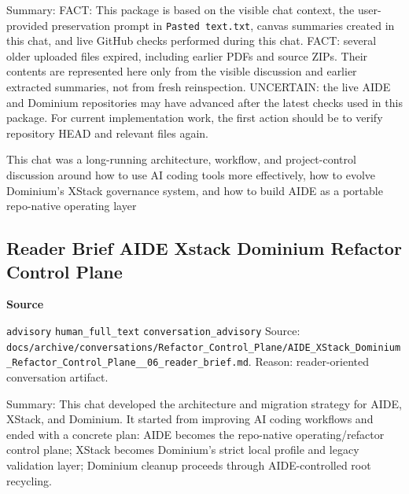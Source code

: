 \documentclass[9pt,a4paper,openany]{book}
\newcommand{\vonecallout}[3]{\par\medskip\noindent\begingroup\setlength{\fboxsep}{7pt}\colorbox{DomCalloutBg}{\parbox{0.94\linewidth}{\textbf{\textcolor{#1}{#2}}\par #3}}\endgroup\par\medskip}
\begin{document}
Summary: FACT: This package is based on the visible chat context, the user-\allowbreak{}provided preservation prompt in \texttt{Pasted text.\allowbreak{}txt}, canvas summaries created in this chat, and live GitHub checks performed during this chat.\allowbreak{} FACT: several older uploaded files expired, including earlier PDFs and source ZIPs.\allowbreak{} Their contents are represented here only from the visible discussion and earlier extracted summaries, not from fresh reinspection.\allowbreak{} UNCERTAIN: the live AIDE and Dominium repositories may have advanced after the latest checks used in this package.\allowbreak{} For current implementation work, the first action should be to verify repository HEAD and relevant files again.\allowbreak{}


This chat was a long-\allowbreak{}running architecture, workflow, and project-\allowbreak{}control discussion around how to use AI coding tools more effectively, how to evolve Dominium's XStack governance system, and how to build AIDE as a portable repo-\allowbreak{}native operating layer



\subsection{Reader Brief AIDE Xstack Dominium Refactor Control Plane}

\vonecallout{DomSlate}{Source}{\texttt{advisory} \texttt{human\_\allowbreak{}full\_\allowbreak{}text} \texttt{conversation\_\allowbreak{}advisory} Source: \texttt{docs/\allowbreak{}archive/\allowbreak{}conversations/\allowbreak{}Refactor\_\allowbreak{}Control\_\allowbreak{}Plane/\allowbreak{}AIDE\_\allowbreak{}XStack\_\allowbreak{}Dominium\_\allowbreak{}Refactor\_\allowbreak{}Control\_\allowbreak{}Plane\_\allowbreak{}\_\allowbreak{}06\_\allowbreak{}reader\_\allowbreak{}brief.\allowbreak{}md}.\allowbreak{} Reason: reader-\allowbreak{}oriented conversation artifact.\allowbreak{}}

Summary: This chat developed the architecture and migration strategy for AIDE, XStack, and Dominium.\allowbreak{} It started from improving AI coding workflows and ended with a concrete plan: AIDE becomes the repo-\allowbreak{}native operating/\allowbreak{}refactor control plane; XStack becomes Dominium's strict local profile and legacy validation layer; Dominium cleanup proceeds through AIDE-\allowbreak{}controlled root recycling.\allowbreak{}
\end{document}
